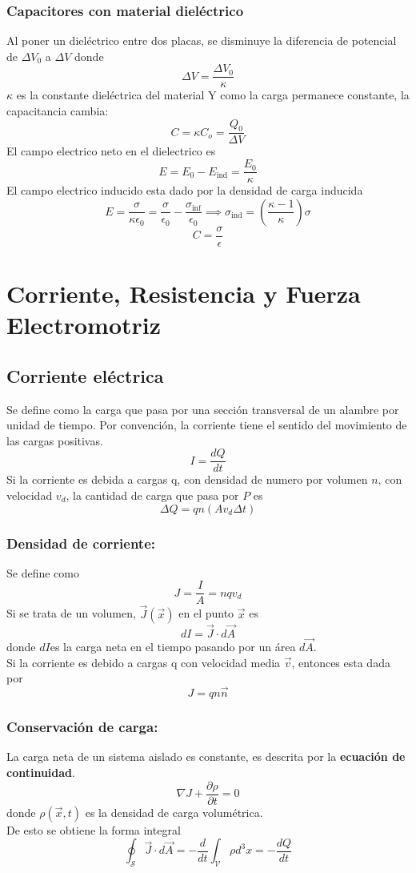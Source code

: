 \documentclass[a4paper, 10pt]{article}
\begin{document}
\begin{multicols*}{2}
	\subsubsection{Capacitores con material dieléctrico}
	Al poner un dieléctrico entre dos placas, se disminuye la diferencia de potencial de $\Delta V_0$ a $\Delta V$ donde
	$$\Delta V = \frac{\Delta V_0}{\kappa}$$
	$\kappa$ es la constante dieléctrica del material
	Y como la carga permanece constante, la capacitancia cambia:
	$$C = \kappa C_o = \frac{Q_0}{\Delta V}$$
	El campo electrico neto en el dielectrico es
	$$E= E_0 -  E_{\text{ind}} = \frac{E_0}{\kappa}$$
	El campo electrico inducido esta dado por la densidad de carga inducida
	$$E=\frac{\sigma}{\kappa \epsilon_0}= \frac{\sigma}{\epsilon_0}- \frac{\sigma_{\text{inf}}}{\epsilon_0} \implies \sigma_{\text{ind}} = (\frac{\kappa -1}{\kappa})\sigma$$
	$$C = \frac{\sigma}{\epsilon}$$
	    
	\section{Corriente, Resistencia y Fuerza Electromotriz}
	\subsection{Corriente eléctrica}
	Se define como la carga que pasa por una sección transversal de un alambre por unidad de tiempo. Por convención, la corriente tiene el sentido del movimiento de las cargas positivas.
	$$I = \frac{dQ}{dt}$$
	Si la corriente es debida a cargas q, con densidad de numero por volumen $n$, con velocidad $v_d$, la cantidad de carga que pasa por $P$ es
	$$\Delta Q= qn(Av_d\Delta t)$$
	
	\subsubsection{Densidad de corriente:} Se define como
	$$J=\frac{I}{A}=nqv_d$$
	Si se trata de un volumen, $\vec{J}(\vec{x})$ en el punto $\vec{x}$ es
	$$dI=\vec{J}\cdot d \vec{A}$$
	donde $dI$es la carga neta en el tiempo pasando por un área $d\vec{A}$.\\
	Si la corriente es debido a cargas q con velocidad media $\vec{v}$, entonces esta dada por
	$$J=qn\vec{n}$$
	    
	\subsubsection{Conservación de carga:} La carga neta de un sistema aislado es constante,
  es descrita por la \textbf{ecuación de continuidad}.
	$$\nabla J + \frac{\partial \rho}{\partial t} = 0$$
	donde $\rho(\vec{x},t)$ es la densidad de carga volumétrica.\\
	De esto se obtiene la forma integral $$\oint_{\mathcal{S}}\vec{J}\cdot d\vec{A}=-\frac{d}{dt}\int_{\mathcal{V}}\rho d^3 x=-\frac{dQ}{dt}$$
	    

\end{multicols*}
\end{document}
